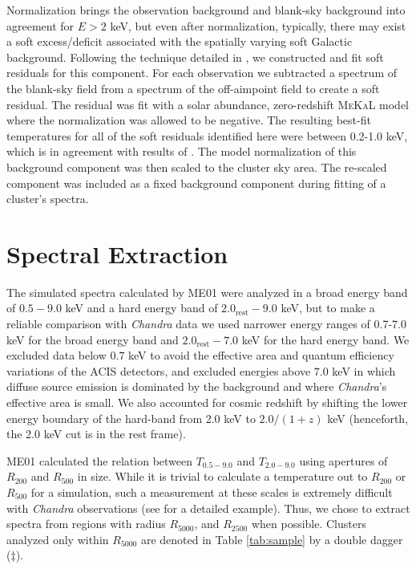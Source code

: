 \documentclass[12pt,preprint]{aastex}
\begin{document}
Normalization brings the observation background and blank-sky
background into agreement for $E > 2$ keV, but even after
normalization, typically, there may exist a soft excess/deficit
associated with the spatially varying soft Galactic
background. Following the technique detailed in
\cite{2005ApJ...628..655V}, we constructed and fit soft residuals for
this component. For each observation we subtracted a spectrum of the
blank-sky field from a spectrum of the off-aimpoint field to create a
soft residual. The residual was fit with a solar abundance,
zero-redshift {\textsc{MeKaL}} model \citep{1985A&AS...62..197M,
1986A&AS...65..511M, 1992SRON, 1995ApJ...438L.115L} where the
normalization was allowed to be negative. The resulting best-fit
temperatures for all of the soft residuals identified here were
between 0.2-1.0 keV, which is in agreement with results of
\cite{2005ApJ...628..655V}. The model normalization of this background
component was then scaled to the cluster sky area. The re-scaled
component was included as a fixed background component during fitting
of a cluster's spectra.

\section{Spectral Extraction} \label{sec:extraction}

The simulated spectra calculated by ME01 were analyzed in a broad
energy band of $0.5-9.0$ keV and a hard energy band of
$2.0_{\mathrm{rest}}-9.0$ keV, but to make a reliable comparison with
{\it{Chandra}} data we used narrower energy ranges of 0.7-7.0 keV for
the broad energy band and $2.0_{\mathrm{rest}}-7.0$ keV for the hard
energy band. We excluded data below $0.7$ keV to
avoid the effective area and quantum efficiency variations of the ACIS
detectors, and excluded energies above $7.0$ keV in which diffuse source
emission is dominated by the background and where {\it{Chandra}}'s
effective area is small. We also accounted for cosmic redshift by
shifting the lower energy boundary of the hard-band from 2.0 keV to
$2.0/(1+z)$ keV (henceforth, the 2.0 keV cut is in the rest
frame).

ME01 calculated the relation between $T_{0.5-9.0}$ and $T_{2.0-9.0}$
using apertures of $R_{200}$ and $R_{500}$ in size. While it is
trivial to calculate a temperature out to $R_{200}$ or $R_{500}$ for
a simulation, such a measurement at these scales is extremely
difficult with {\it Chandra} observations (see \cite{2005ApJ...628..655V} for
a detailed example). Thus, we chose to extract spectra from regions
with radius $R_{5000}$, and $R_{2500}$ when possible. Clusters
analyzed only within $R_{5000}$ are denoted in Table \ref{tab:sample}
by a double dagger ($\ddagger$).
\end{document}
